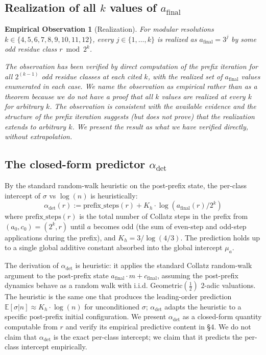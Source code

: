 \documentclass{article}
\newtheorem{observation}[theorem]{Empirical Observation}
\theoremstyle{plain}
\begin{document}
\subsection{Realization of all $k$ values of $a_{\text{final}}$}
\begin{observation}[Realization]
\label{obs:realization}
For modular resolutions $k \in \{4, 5, 6, 7, 8, 9, 10, 11, 12\}$, every $j \in \{1, \ldots, k\}$ is realized as $a_{\text{final}} = 3^j$ by some odd residue class $r \bmod 2^k$.

The observation has been verified by direct computation of the prefix iteration for all $2^{(k-1)}$ odd residue classes at each cited $k$, with the realized set of $a_{\text{final}}$ values enumerated in each case. We name the observation as empirical rather than as a theorem because we do not have a proof that all $k$ values are realized at every $k$ for arbitrary $k$. The observation is consistent with the available evidence and the structure of the prefix iteration suggests (but does not prove) that the realization extends to arbitrary $k$. We present the result as what we have verified directly, without extrapolation.
\end{observation}

\subsection{The closed-form predictor $\alpha_{\text{det}}$}
By the standard random-walk heuristic on the post-prefix state, the per-class intercept of $\sigma$ vs $\log(n)$ is heuristically: $$\alpha_{\text{det}}(r) := \text{prefix\_steps}(r) + K_h \cdot \log (a_{\text{final}}(r)/2^k)$$ where $\text{prefix\_steps}(r)$ is the total number of Collatz steps in the prefix from $(a_0, c_0) = (2^k, r)$ until $a$ becomes odd (the sum of even-step and odd-step applications during the prefix), and $K_h = 3/ \log(4/3)$. The prediction holds up to a single global additive constant absorbed into the global intercept $\mu_a$.

The derivation of $\alpha_{\text{det}}$ is heuristic: it applies the standard Collatz random-walk argument \citep{lagarias1985} to the post-prefix state $a_{\text{final}} \cdot m + c_{\text{final}}$, assuming the post-prefix dynamics behave as a random walk with i.i.d. $\text{Geometric}(\frac{1}{2})$ 2-adic valuations. The heuristic is the same one that produces the leading-order prediction $\mathbb{E}[\sigma \vert n] \approx K_h \cdot \log(n)$ for unconditioned $\sigma$; $\alpha_{\text{det}}$ adapts the heuristic to a specific post-prefix initial configuration. We present $\alpha_{\text{det}}$ as a closed-form quantity computable from $r$ and verify its empirical predictive content in \S4. We do not claim that $\alpha_{\text{det}}$ is the exact per-class intercept; we claim that it predicts the per-class intercept empirically.
\end{document}
